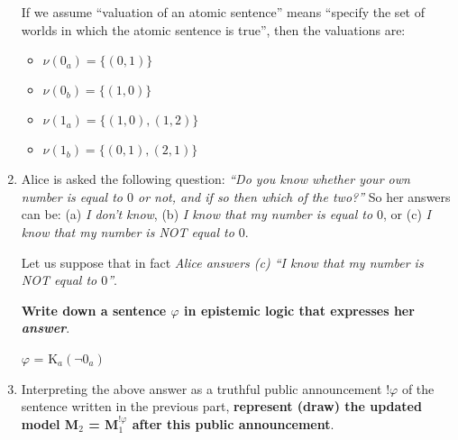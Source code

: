 \documentclass[leqno]{article}
\begin{document}
\begin{enumerate}
    If we assume ``valuation of an atomic sentence'' means ``specify the set of worlds in which the atomic sentence is true'', then the valuations are:
    
    \begin{itemize}[label={}]
    	\item $\nu(0_a)= \{(0, 1)\}$
    	\item $\nu(0_b)= \{(1, 0)\}$
    	\item $\nu(1_a)= \{(1, 0), (1, 2)\}$
    	\item $\nu(1_b)= \{(0, 1), (2, 1)\}$
    \end{itemize}    
    
    \item Alice is asked the following question: \textit{``Do you know whether your own number is equal to $0$ or not, and if so then which of the two?''} So her answers can be: (a) \textit{I don't know}, (b) \textit{I know that my number is equal to $0$}, or (c) \textit{I know that my number is NOT equal to $0$}.
    
    Let us suppose that in fact \textit{Alice answers (c) ``I know that my number is NOT equal to $0$''}.
    
    \textbf{Write down a sentence $\varphi$ in epistemic logic that expresses her \textit{answer}}.
    
    $\varphi$ = K$_a(\neg 0_a)$
    
    \item Interpreting the above answer as a truthful public announcement $!\varphi$ of the sentence written in the previous part, \textbf{represent (draw) the updated model M$_2$ = M$_1^{!\varphi}$ after this public announcement}.
    

\end{enumerate}
\end{document}
